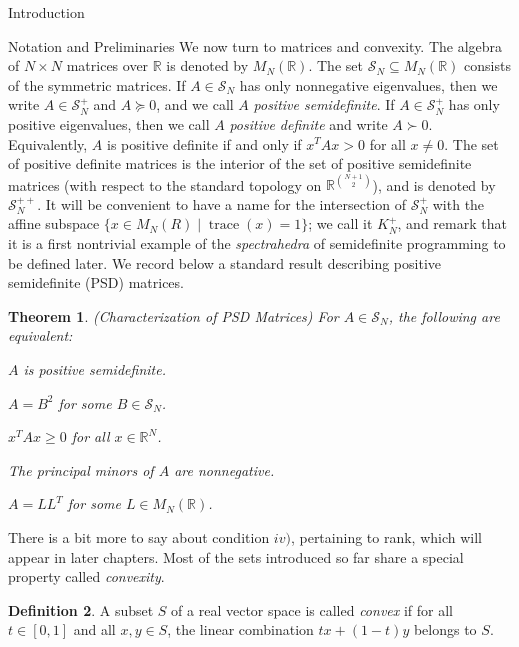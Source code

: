 \documentclass[12pt,oneside,final]{ucthesisucsbmath2010}
\newcommand{\R}{\mathbb{R}}
\newcommand{\s}{\mathcal{S}}
\DeclareMathOperator{\trace}{trace}
\newcounter{qcounter}
\newtheorem{thm}{Theorem}[section]
\theoremstyle{definition}
\newtheorem{defn}[thm]{Definition}
\begin{document}
\begin{chapter}{Introduction}
\begin{section}{Notation and Preliminaries}
We now turn to matrices and convexity. The algebra of $N\times N$ matrices over $\R$ is denoted by $M_N(\R)$. The set $\s_N\subseteq M_N(\R)$ consists of the symmetric matrices. If $A\in\s_N$ has only nonnegative eigenvalues, then we write $A \in \s_N^+$ and $A \succeq 0$, and we call $A$ \emph{positive semidefinite}. If $A \in \s_N^+$ has only positive eigenvalues, then we call $A$ \emph{positive definite} and write $A \succ 0$. Equivalently, $A$ is positive definite if and only if $x^TAx >0$ for all $x \neq 0$. The set of positive definite matrices is the interior of the set of positive semidefinite matrices (with respect to the standard topology on $\R^{\binom{N+1}{2}}$), and is denoted by $\s_N^{++}$. It will be convenient to have a name for the intersection of $\s_N^+$ with the affine subspace $\{x \in M_N(R) \mid \trace (x)=1\}$; we call it $K_N^+$, and remark that it is a first nontrivial example of the \emph{spectrahedra} of semidefinite programming to be defined later. We record below a standard result describing positive semidefinite (PSD) matrices.

\begin{thm}(Characterization of PSD Matrices) For $A \in \s_N$, the following are equivalent:
\begin{list}{)}{}
\item $A$ is positive semidefinite.
\item $A = B^2$ for some $B \in \s_N$.
\item $x^TAx \geq 0$ for all $x \in \R^N$.
\item The principal minors of $A$ are nonnegative.
\item $A=LL^T$ for some $L \in M_N(\R)$.
\end{list}
\label{PSDMat}
\end{thm}
There is a bit more to say about condition $iv)$, pertaining to rank, which will appear in later chapters. Most of the sets introduced so far share a special property called \emph{convexity}.

\begin{defn}A subset $S$ of a real vector space is called \emph{convex} if for all $t \in [0,1]$ and all $x,y \in S$, the linear combination $tx+(1-t)y$ belongs to $S$.
\end{defn}


\end{section}
\end{chapter}
\end{document}

